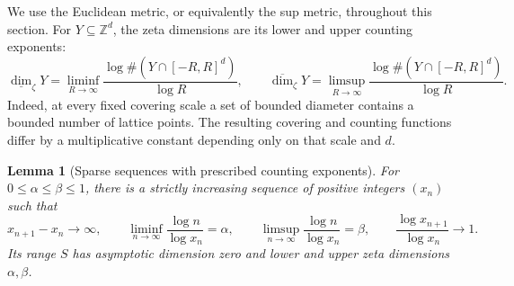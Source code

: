 \documentclass[11pt,a4paper]{article}
\newtheorem{lemma}[theorem]{Lemma}
\theoremstyle{definition}
\theoremstyle{remark}
\numberwithin{equation}{section}
\begin{document}
We use the Euclidean metric, or equivalently the sup metric, throughout this section. For $Y\subseteq\mathbb Z^d$, the zeta dimensions are its lower and upper counting exponents:
\[
 \underline{\dim}_{\zeta}Y
 =\liminf_{R\to\infty}\frac{\log\#(Y\cap[-R,R]^d)}{\log R},
 \qquad
 \overline{\dim}_{\zeta}Y
 =\limsup_{R\to\infty}\frac{\log\#(Y\cap[-R,R]^d)}{\log R}.
\]
Indeed, at every fixed covering scale a set of bounded diameter contains a bounded number of lattice points. The resulting covering and counting functions differ by a multiplicative constant depending only on that scale and $d$.

\begin{lemma}[Sparse sequences with prescribed counting exponents]
For $0\leq\alpha\leq\beta\leq1$, there is a strictly increasing sequence of positive integers $(x_n)$ such that
\[
 x_{n+1}-x_n\longrightarrow\infty,\qquad
 \liminf_{n\to\infty}\frac{\log n}{\log x_n}=\alpha,
 \qquad
 \limsup_{n\to\infty}\frac{\log n}{\log x_n}=\beta,
 \qquad
 \frac{\log x_{n+1}}{\log x_n}\longrightarrow1.
\]
Its range $S$ has asymptotic dimension zero and lower and upper zeta dimensions $\alpha,\beta$.
\end{lemma}
\end{document}

